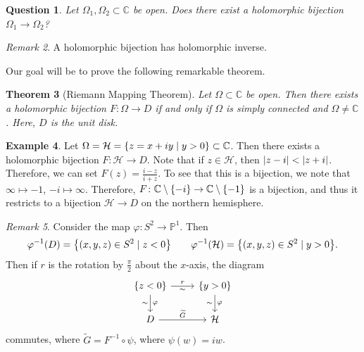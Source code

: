\documentclass[leqno, openany]{memoir}
\newtheorem{thm}{Theorem}[section]
\newtheorem{quest}[thm]{Question}
\theoremstyle{definition}
\newtheorem{exm}[thm]{Example}
\theoremstyle{remark}
\newtheorem{rmk}[thm]{Remark}
\theoremstyle{plain}
\theoremstyle{definition}
\theoremstyle{remark}
\newcommand{\C}{\mathbb{C}}
\renewcommand{\P}{\mathbb{P}}
\newcommand{\mc}[1]{\mathcal{#1}}
\newcommand{\wt}[1]{\widetilde{#1}}
\begin{document}
\begin{quest}
    Let $\Omega_1, \Omega_2 \subset \C$ be open. Does there exist a holomorphic bijection $\Omega_1 \to \Omega_2$?
\end{quest}

\begin{rmk}
    A holomorphic bijection has holomorphic inverse.
\end{rmk}

Our goal will be to prove the following remarkable theorem.
\begin{thm}[Riemann Mapping Theorem]\label{thm:rmt}
    Let $\Omega \subset \C$ be open. Then there exists a holomorphic bijection $F \colon \Omega \to D$ if and only if $\Omega$ is simply connected and $\Omega \neq \C$. Here, $D$ is the unit disk.
\end{thm}

\begin{exm}
    Let $\Omega = \mc{H} = \qty{z = x + iy \mid y > 0} \subset \C$. Then there exists a holomorphic bijection $F \colon \mc{H} \to D$. Note that if $z \in \mc{H}$, then $\abs{z-i} < \abs{z + i}$. Therefore, we can set $F(z) = \frac{i-z}{i+z}$. To see that this is a bijection, we note that $\infty \mapsto -1$, $-i \mapsto \infty$. Therefore, $F \colon \C \setminus \qty{-i} \to \C \setminus \qty{-1}$ is a bijection, and thus it restricts to a bijection $\mc{H} \to D$ on the northern hemisphere.
\end{exm}

\begin{rmk}
    Consider the map $\varphi \colon S^2 \to \P^1$. Then 
    \[ \varphi^{-1}(D) = \qty{(x,y,z) \in S^2 \mid z < 0} \qquad \varphi^{-1} (\mc{H}) = \qty{(x,y,z) \in S^2 \mid y > 0}. \]
    Then if $r$ is the rotation by $\frac{\pi}{2}$ about the $x$-axis, the diagram
    \begin{equation*}
    \begin{tikzcd}
        \qty{z < 0} \ar{r}{r}[swap]{\sim} \ar{d}{\varphi}[swap]{\sim} & \qty{y > 0} \ar{d}{\varphi}[swap]{\sim} \\
        D \ar{r}{\wt{G}} & \mc{H}
    \end{tikzcd}
    \end{equation*}
    commutes, where $\wt{G} = F^{-1} \circ \psi$, where $\psi(w) = iw$.
\end{rmk}
\end{document}

